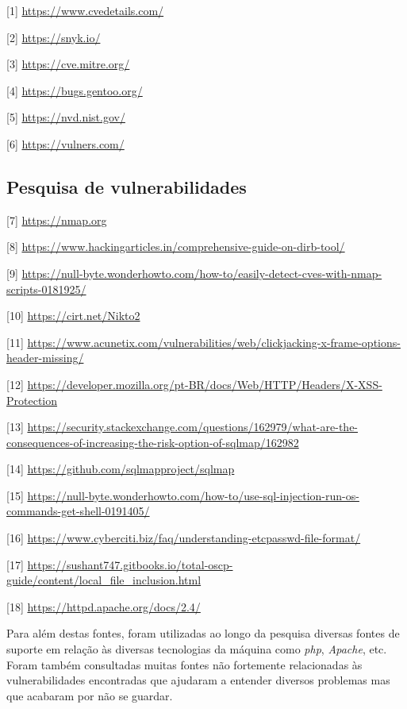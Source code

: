 \documentclass[10pt,english]{article}
\begin{document}
[1] \url{https://www.cvedetails.com/}

[2] \url{https://snyk.io/}

[3] \url{https://cve.mitre.org/}

[4] \url{https://bugs.gentoo.org/}

[5] \url{https://nvd.nist.gov/}

[6] \url{https://vulners.com/}

\subsection{Pesquisa de vulnerabilidades}

[7] \url{https://nmap.org}

[8] \url{https://www.hackingarticles.in/comprehensive-guide-on-dirb-tool/}

[9] \url{https://null-byte.wonderhowto.com/how-to/easily-detect-cves-with-nmap-scripts-0181925/}

[10] \url{https://cirt.net/Nikto2}

[11] \url{https://www.acunetix.com/vulnerabilities/web/clickjacking-x-frame-options-header-missing/}

[12] \url{https://developer.mozilla.org/pt-BR/docs/Web/HTTP/Headers/X-XSS-Protection}

[13] \url{https://security.stackexchange.com/questions/162979/what-are-the-consequences-of-increasing-the-risk-option-of-sqlmap/162982}

[14] \url{https://github.com/sqlmapproject/sqlmap}

[15] \url{https://null-byte.wonderhowto.com/how-to/use-sql-injection-run-os-commands-get-shell-0191405/}

[16] \url{https://www.cyberciti.biz/faq/understanding-etcpasswd-file-format/}

[17] \url{https://sushant747.gitbooks.io/total-oscp-guide/content/local_file_inclusion.html}

[18] \url{https://httpd.apache.org/docs/2.4/}

\par Para além destas fontes, foram utilizadas ao longo da pesquisa diversas fontes de suporte em relação às diversas tecnologias da máquina como \textit{php}, \textit{Apache}, etc. Foram também consultadas muitas fontes não fortemente relacionadas às vulnerabilidades encontradas que ajudaram a entender diversos problemas mas que acabaram por não se guardar.

\clearpage
\end{document}
